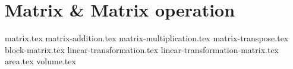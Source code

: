 \chapter{Matrix \& Matrix operation}
{matrix.tex}
{matrix-addition.tex}
{matrix-multiplication.tex}
{matrix-transpose.tex}
{block-matrix.tex}
{linear-transformation.tex}
{linear-transformation-matrix.tex}
{area.tex}
{volume.tex}